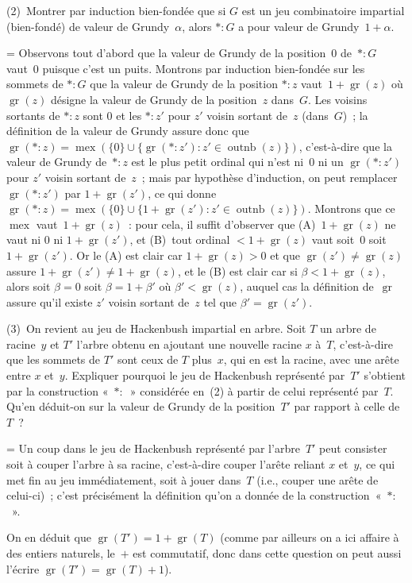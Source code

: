\documentclass[12pt,a4paper]{article}
\theoremstyle{definition}
\newcommand{\outnb}{\operatorname{outnb}}
\newcommand{\mex}{\operatorname{mex}}
\newcommand{\gr}{\operatorname{gr}}
\newif\ifcorrige
\newenvironment{corrige}%
{\ifcorrige\relax\else\setbox0=\vbox\bgroup\fi%
\smallbreak\noindent{\underbar{\textit{Corrigé.}}\quad}}
{{\hbox{}\nobreak\hfill\checkmark}%
\ifcorrige\relax\else\egroup\fi\par}
\begin{document}
\smallbreak

(2) Montrer par induction bien-fondée que si $G$ est un jeu
combinatoire impartial (bien-fondé) de valeur de Grundy $\alpha$,
alors $*{:}G$ a pour valeur de Grundy $1+\alpha$.

\begin{corrige}
Observons tout d'abord que la valeur de Grundy de la position $0$
de $*{:}G$ vaut $0$ puisque c'est un puits.  Montrons par induction
bien-fondée sur les sommets de $*{:}G$ que la valeur de Grundy de la
position $*{:}z$ vaut $1+\gr(z)$ où $\gr(z)$ désigne la valeur de
Grundy de la position $z$ dans $G$.  Les voisins sortants de $*{:}z$
sont $0$ et les $*{:}z'$ pour $z'$ voisin sortant de $z$ (dans $G$) ;
la définition de la valeur de Grundy assure donc que $\gr(*{:}z) =
\mex(\{0\} \cup \{\gr(*{:}z') : z'\in\outnb(z)\})$, c'est-à-dire que
la valeur de Grundy de $*{:}z$ est le plus petit ordinal qui n'est
ni $0$ ni un $\gr(*{:}z')$ pour $z'$ voisin sortant de $z$ ; mais par
hypothèse d'induction, on peut remplacer $\gr(*{:}z')$ par
$1+\gr(z')$, ce qui donne $\gr(*{:}z) = \mex(\{0\} \cup \{1+\gr(z') :
z'\in\outnb(z)\})$.  Montrons que ce $\mex$ vaut $1+\gr(z)$ : pour
cela, il suffit d'observer que (A) $1+\gr(z)$ ne vaut ni $0$ ni
$1+\gr(z')$, et (B) tout ordinal $<1+\gr(z)$ vaut soit $0$ soit
$1+\gr(z')$.  Or le (A) est clair car $1+\gr(z) > 0$ et que $\gr(z')
\neq \gr(z)$ assure $1+\gr(z') \neq 1+\gr(z)$, et le (B) est clair car
si $\beta < 1+\gr(z)$, alors soit $\beta=0$ soit $\beta = 1+\beta'$ où
$\beta' < \gr(z)$, auquel cas la définition de $\gr$ assure qu'il
existe $z'$ voisin sortant de $z$ tel que $\beta' = \gr(z')$.
\end{corrige}

\smallbreak

(3) On revient au jeu de Hackenbush impartial en arbre.  Soit $T$ un
arbre de racine $y$ et $T'$ l'arbre obtenu en ajoutant une nouvelle
racine $x$ à $T$, c'est-à-dire que les sommets de $T'$ sont ceux de
$T$ plus $x$, qui en est la racine, avec une arête entre $x$ et $y$.
Expliquer pourquoi le jeu de Hackenbush représenté par $T'$ s'obtient
par la construction « $*{:}$ » considérée en (2) à partir de celui
représenté par $T$.  Qu'en déduit-on sur la valeur de Grundy de la
position $T'$ par rapport à celle de $T$ ?

\begin{corrige}
Un coup dans le jeu de Hackenbush représenté par l'arbre $T'$ peut
consister soit à couper l'arbre à sa racine, c'est-à-dire couper
l'arête reliant $x$ et $y$, ce qui met fin au jeu immédiatement, soit
à jouer dans $T$ (i.e., couper une arête de celui-ci) ; c'est
précisément la définition qu'on a donnée de la
construction « $*{:}$ ».

On en déduit que $\gr(T') = 1 + \gr(T)$ (comme par ailleurs on a ici
affaire à des entiers naturels, le $+$ est commutatif, donc dans cette
question on peut aussi l'écrire $\gr(T') = \gr(T) + 1$).
\end{corrige}
\end{document}
